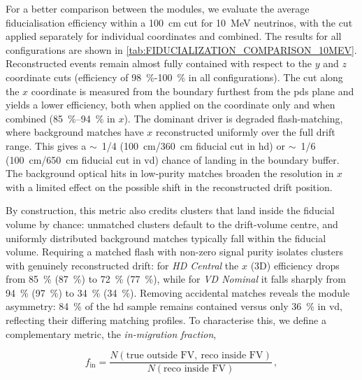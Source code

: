 For a better comparison between the modules, we evaluate the average fiducialisation efficiency within a \SI{100}{\centi\meter} cut for \SI{10}{\mega\electronvolt} neutrinos, with the cut applied separately for individual coordinates and combined. The results for all configurations are shown in \cref{tab:FIDUCIALIZATION_COMPARISON_10MEV}. Reconstructed events remain almost fully contained with respect to the $y$ and $z$ coordinate cuts (efficiency of \SI{98}{\percent}-\SI{100}{\percent} in all configurations). The cut along the $x$ coordinate is measured from the boundary furthest from the \gls{pds} plane and yields a lower efficiency, both when applied on the coordinate only and when combined (\SI{85}{\percent}--\SI{94}{\percent} in $x$). The dominant driver is degraded flash-matching, where background matches have $x$ reconstructed uniformly over the full drift range. This gives a $\sim$~1/4 (\SI{100}{\centi\meter}/\SI{360}{\centi\meter} fiducial cut in \gls{hd}) or $\sim$~1/6 (\SI{100}{\centi\meter}/\SI{650}{\centi\meter} fiducial cut in \gls{vd}) chance of landing in the boundary buffer. The background optical hits in low-purity matches broaden the resolution in $x$ with a limited effect on the possible shift in the reconstructed drift position.

By construction, this metric also credits clusters that land inside the fiducial volume by chance: unmatched clusters default to the drift-volume centre, and uniformly distributed background matches typically fall within the fiducial volume. Requiring a matched flash with non-zero signal purity isolates clusters with genuinely reconstructed drift: for \emph{HD Central} the $x$ (3D) efficiency drops from \SI{85}{\percent} (\SI{87}{\percent}) to \SI{72}{\percent} (\SI{77}{\percent}), while for \emph{VD Nominal} it falls sharply from \SI{94}{\percent} (\SI{97}{\percent}) to \SI{34}{\percent} (\SI{34}{\percent}). Removing accidental matches reveals the module asymmetry: \SI{84}{\percent} of the \gls{hd} sample remains contained versus only \SI{36}{\percent} in \gls{vd}, reflecting their differing matching profiles. To characterise this, we define a complementary metric, the \emph{in-migration fraction},

\begin{equation}
f_\text{in} = \frac{N(\text{true outside FV},\ \text{reco inside FV})}{N(\text{reco inside FV})}\,,
\end{equation}

